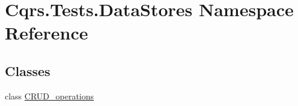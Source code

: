 \hypertarget{namespaceCqrs_1_1Tests_1_1DataStores}{}\section{Cqrs.\+Tests.\+Data\+Stores Namespace Reference}
\label{namespaceCqrs_1_1Tests_1_1DataStores}
\subsection*{Classes}
\begin{DoxyCompactItemize}
\item 
class \hyperlink{classCqrs_1_1Tests_1_1DataStores_1_1CRUD__operations}{C\+R\+U\+D\+\_\+operations}
\end{DoxyCompactItemize}
